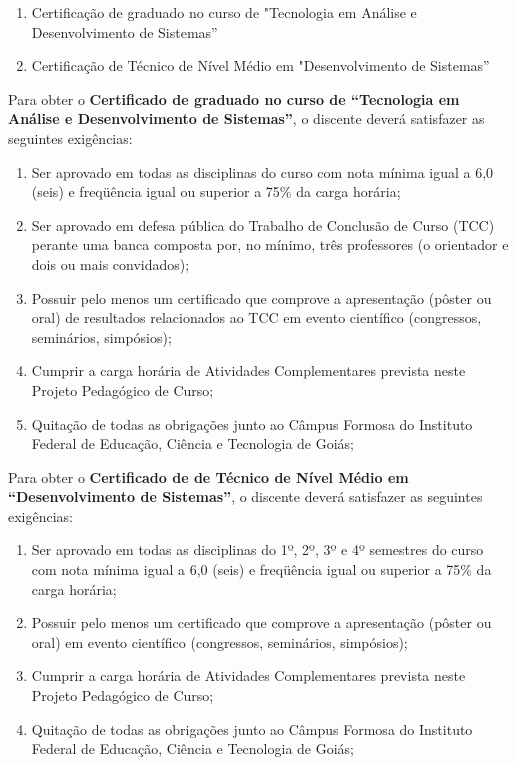 \documentclass[
	10pt,				%
	openright,			%
	twoside,			%
	a4paper,			%
	english,			%
	french,				%
	brazil,				%
	sumario=tradicional
]{abntex2}
\begin{document}
\begin{enumerate}
	\item Certificação de graduado no curso de "Tecnologia em Análise e Desenvolvimento de Sistemas''
	\item Certificação de Técnico de Nível Médio em "Desenvolvimento de Sistemas''
\end{enumerate}

Para obter o \textbf{Certificado de graduado no curso de ``Tecnologia em Análise e Desenvolvimento de Sistemas''}, o discente deverá satisfazer as seguintes exigências:
\begin{enumerate}
	\item Ser aprovado em todas as disciplinas do curso com nota mínima igual a 6,0 (seis) e freqüência igual ou superior a 75\% da carga horária;
	\item Ser aprovado em defesa pública do Trabalho de Conclusão de Curso (TCC) perante uma banca composta por, no mínimo, três professores (o orientador e dois ou mais convidados);
	\item Possuir pelo menos um certificado que comprove a apresentação (pôster ou oral) de resultados relacionados ao TCC em evento científico (congressos, seminários, simpósios);
	\item Cumprir a carga horária de Atividades Complementares prevista neste Projeto Pedagógico de Curso;
	\item Quitação de todas as obrigações junto ao Câmpus Formosa do Instituto Federal de Educação, Ciência e Tecnologia de Goiás;
\end{enumerate}


Para obter o \textbf{Certificado de  de Técnico de Nível Médio em ``Desenvolvimento de Sistemas''}, o discente deverá satisfazer as seguintes exigências:
\begin{enumerate}
	\item Ser aprovado em todas as disciplinas do 1º, 2º, 3º e 4º semestres do curso com nota mínima igual a 6,0 (seis) e freqüência igual ou superior a 75\% da carga horária;
	\item Possuir pelo menos um certificado que comprove a apresentação (pôster ou oral) em evento científico (congressos, seminários, simpósios);
	\item Cumprir a carga horária de Atividades Complementares prevista neste Projeto Pedagógico de Curso;
	\item Quitação de todas as obrigações junto ao Câmpus Formosa do Instituto Federal de Educação, Ciência e Tecnologia de Goiás;
\end{enumerate}
\end{document}
